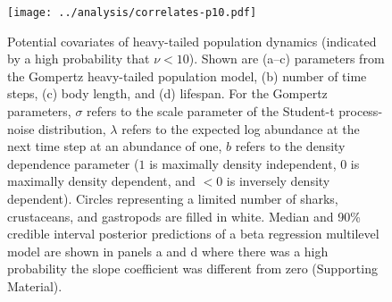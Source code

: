 \clearpage

\begin{figure}[htbp]
\begin{center}
\texttt{[image: ../analysis/correlates-p10.pdf]}
\caption{
Potential covariates of heavy-tailed population dynamics (indicated by a high
probability that $\nu < 10$). Shown are (a--c) parameters from the Gompertz
heavy-tailed population model, (b) number of time steps, (c) body length, and
(d) lifespan. For the Gompertz parameters, $\sigma$ refers to the scale
parameter of the Student-t process-noise distribution, $\lambda$ refers to the
expected log abundance at the next time step at an abundance of one, $b$
refers to the density dependence parameter ($1$ is maximally density
independent, $0$ is maximally density dependent, and $<0$ is inversely density
dependent).
Circles representing a limited number of sharks, crustaceans, and gastropods
are filled in white. Median and 90\% credible interval posterior predictions of
a beta regression multilevel model are shown in panels a and d where there was
a high probability the slope coefficient was different from zero (Supporting
Material).
}
\label{fig:correlates}
\end{center}
\end{figure}
